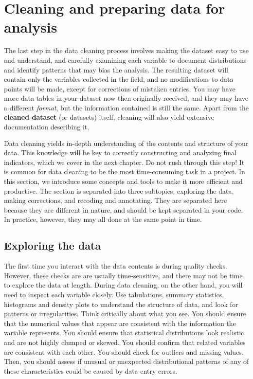 \documentclass[
]{book}
\begin{document}
\hypertarget{cleaning-and-preparing-data-for-analysis}{%
\section*{Cleaning and preparing data for analysis}\label{cleaning-and-preparing-data-for-analysis}}

The last step in the data cleaning process involves
making the dataset easy to use and understand, and
carefully examining each variable to document distributions
and identify patterns that may bias the analysis.
The resulting dataset will contain only the variables collected in the field, and
no modifications to data points will be made,
except for corrections of mistaken entries.
You may have more data tables in your dataset now then originally received,
and they may have a different \emph{format},
but the information contained is still the same.
Apart from the \textbf{cleaned dataset} (or datasets) itself,
cleaning will also yield extensive documentation describing it.

Data cleaning yields in-depth understanding of the contents and structure of your data.
This knowledge will be key to correctly constructing and analyzing final indicators,
which we cover in the next chapter.
Do not rush through this step!
It is common for data cleaning to be the most time-consuming task in a project.
In this section, we introduce some concepts and tools to make it more efficient and productive.
The section is separated into three subtopics:
exploring the data, making corrections, and recoding and annotating.
They are separated here because they are different in nature,
and should be kept separated in your code.
In practice, however, they may all done at the same point in time.

\hypertarget{exploring-the-data}{%
\subsection*{Exploring the data}\label{exploring-the-data}}

The first time you interact with the data contents is during quality checks.
However, these checks are are usually time-sensitive,
and there may not be time to explore the data at length.
During data cleaning, on the other hand,
you will need to inspect each variable closely.
Use tabulations, summary statistics, histograms and density plots to understand the structure of data,
and look for patterns or irregularities.
Think critically about what you see.
You should ensure that the numerical values that appear
are consistent with the information the variable represents.
You should ensure that statistical distributions look realistic
and are not highly clumped or skewed.
You should confirm that related variables are consistent with each other.
You should check for outliers and missing values.
Then, you should assess if unusual or unexpected distributional patterns
of any of these characteristics could be caused by data entry errors.
\end{document}
